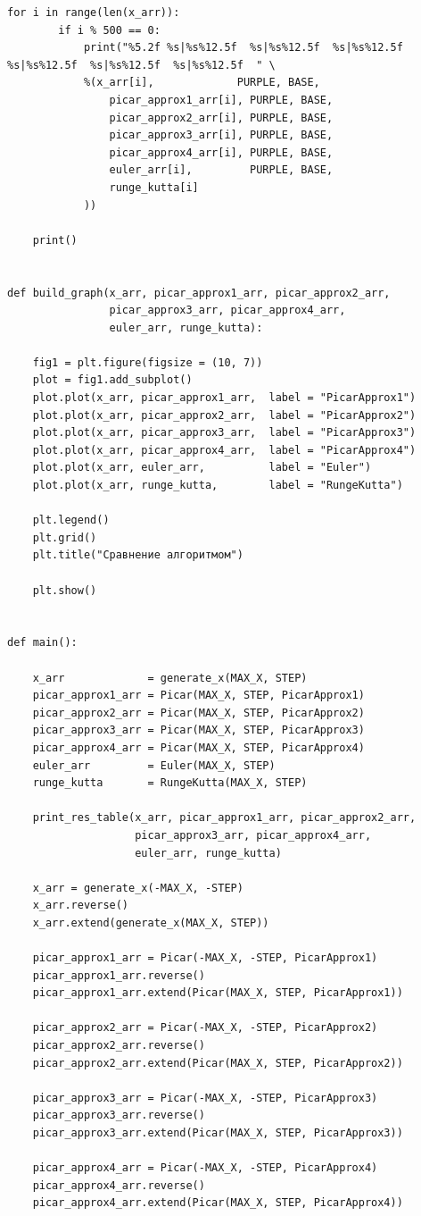 \documentclass[a4paper,14pt, unknownkeysallowed]{extreport}
\begin{document}
\begin{center}
\begin{lstlisting}[label=lst:parallel_processing,caption=Исходный код алгоритмов]
	for i in range(len(x_arr)):
		if i % 500 == 0:
			print("%5.2f %s|%s%12.5f  %s|%s%12.5f  %s|%s%12.5f  %s|%s%12.5f  %s|%s%12.5f  %s|%s%12.5f  " \
			%(x_arr[i],             PURPLE, BASE, 
				picar_approx1_arr[i], PURPLE, BASE,
				picar_approx2_arr[i], PURPLE, BASE,
				picar_approx3_arr[i], PURPLE, BASE,
				picar_approx4_arr[i], PURPLE, BASE,
				euler_arr[i],         PURPLE, BASE,
				runge_kutta[i]
			))

	print()


def build_graph(x_arr, picar_approx1_arr, picar_approx2_arr, 
				picar_approx3_arr, picar_approx4_arr, 
				euler_arr, runge_kutta):

	fig1 = plt.figure(figsize = (10, 7))
	plot = fig1.add_subplot()
	plot.plot(x_arr, picar_approx1_arr,  label = "PicarApprox1")
	plot.plot(x_arr, picar_approx2_arr,  label = "PicarApprox2")
	plot.plot(x_arr, picar_approx3_arr,  label = "PicarApprox3")
	plot.plot(x_arr, picar_approx4_arr,  label = "PicarApprox4")
	plot.plot(x_arr, euler_arr,          label = "Euler")
	plot.plot(x_arr, runge_kutta,        label = "RungeKutta")

	plt.legend()
	plt.grid()
	plt.title("Сравнение алгоритмом")

	plt.show()


def main():

	x_arr			  = generate_x(MAX_X, STEP)
	picar_approx1_arr = Picar(MAX_X, STEP, PicarApprox1)
	picar_approx2_arr = Picar(MAX_X, STEP, PicarApprox2)
	picar_approx3_arr = Picar(MAX_X, STEP, PicarApprox3)
	picar_approx4_arr = Picar(MAX_X, STEP, PicarApprox4)
	euler_arr 		  = Euler(MAX_X, STEP)
	runge_kutta 	  = RungeKutta(MAX_X, STEP)

	print_res_table(x_arr, picar_approx1_arr, picar_approx2_arr, 
					picar_approx3_arr, picar_approx4_arr, 
					euler_arr, runge_kutta)

	x_arr = generate_x(-MAX_X, -STEP)
	x_arr.reverse()
	x_arr.extend(generate_x(MAX_X, STEP))

	picar_approx1_arr = Picar(-MAX_X, -STEP, PicarApprox1)
	picar_approx1_arr.reverse()
	picar_approx1_arr.extend(Picar(MAX_X, STEP, PicarApprox1))

	picar_approx2_arr = Picar(-MAX_X, -STEP, PicarApprox2)
	picar_approx2_arr.reverse()
	picar_approx2_arr.extend(Picar(MAX_X, STEP, PicarApprox2))

	picar_approx3_arr = Picar(-MAX_X, -STEP, PicarApprox3)
	picar_approx3_arr.reverse()
	picar_approx3_arr.extend(Picar(MAX_X, STEP, PicarApprox3))

	picar_approx4_arr = Picar(-MAX_X, -STEP, PicarApprox4)
	picar_approx4_arr.reverse()
	picar_approx4_arr.extend(Picar(MAX_X, STEP, PicarApprox4))


\end{lstlisting}
\end{center}
\end{document}
